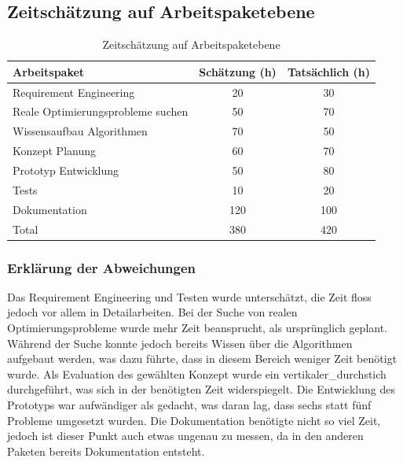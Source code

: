\FloatBarrier

\subsection{Zeitschätzung auf Arbeitspaketebene}
\begin{table}[ht]
\centering
  \begin{tabular}{ l | c | c }
	\hline
	\rowcolor{gray}
	\textbf{Arbeitspaket}					&	\textbf{Schätzung (h)}	& \textbf{Tatsächlich (h)}	\\ \hline
	Requirement Engineering					&	20			& 30	\\ \hline
	Reale Optimierungsprobleme suchen			&	50			& 70	\\ \hline
	Wissensaufbau Algorithmen				&	70			& 50	\\ \hline
	Konzept Planung						&	60			& 70	\\ \hline
	Prototyp Entwicklung					&	50			& 80	\\ \hline
	Tests								&	10			& 20	\\ \hline
	Dokumentation						&	120			& 100	\\ \hline \hline
	Total								&	380			& 420	\\ \hline
  \end{tabular}
   \caption{Zeitschätzung auf Arbeitspaketebene}\label{table:time_estimation}
\end{table}

\FloatBarrier

\subsubsection{Erklärung der Abweichungen}
Das Requirement Engineering und Testen wurde unterschätzt, die Zeit floss jedoch vor allem in Detailarbeiten. Bei der Suche von realen Optimierungsprobleme wurde mehr Zeit beansprucht, als
ursprünglich geplant. Während der Suche konnte jedoch bereits Wissen über die Algorithmen aufgebaut werden, was dazu führte, dass in diesem Bereich weniger Zeit benötigt wurde. Als 
Evaluation des gewählten Konzept wurde ein \gls{vertikaler_durchstich} durchgeführt, was sich in der benötigten Zeit widerspiegelt. Die Entwicklung des Prototyps war aufwändiger 
als gedacht, was daran lag, dass sechs statt fünf Probleme umgesetzt wurden. Die Dokumentation benötigte nicht so viel Zeit, jedoch ist dieser Punkt auch etwas ungenau zu 
messen, da in den anderen Paketen bereits Dokumentation entsteht.
